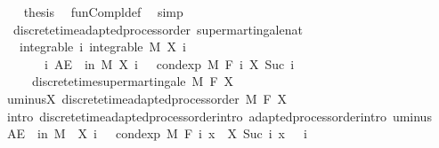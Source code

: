 \begin{isabellebody}
\ \ \isamarkupfalse%
\ {\isacharquery}{\kern0pt}thesis\ \isamarkupfalse%
\ fun{\isacharunderscore}{\kern0pt}Compl{\isacharunderscore}{\kern0pt}def\ \isamarkupfalse%
\ simp\isanewline
{}\isamarkupfalse%
%
\endisatagproof
{\isafoldproof}%
%
\isadelimproof
\isanewline
%
\endisadelimproof
\isanewline
{}\isamarkupfalse%
\ {\isacharparenleft}{\kern0pt}\ discrete{\isacharunderscore}{\kern0pt}time{\isacharunderscore}{\kern0pt}adapted{\isacharunderscore}{\kern0pt}process{\isacharunderscore}{\kern0pt}order{\isacharparenright}{\kern0pt}\ supermartingale{\isacharunderscore}{\kern0pt}nat{\isacharcolon}{\kern0pt}\isanewline
\ \ \ integrable{\isacharcolon}{\kern0pt}\ {\isachardoublequoteopen}{\isasymAnd}i{\isachardot}{\kern0pt}\ integrable\ M\ {\isacharparenleft}{\kern0pt}X\ i{\isacharparenright}{\kern0pt}{\isachardoublequoteclose}\ \isanewline
\ \ \ \ \ \ \ {\isachardoublequoteopen}{\isasymAnd}i{\isachardot}{\kern0pt}\ AE\ {\isasymxi}\ in\ M{\isachardot}{\kern0pt}\ X\ i\ {\isasymxi}\ {\isasymge}\ cond{\isacharunderscore}{\kern0pt}exp\ M\ {\isacharparenleft}{\kern0pt}F\ i{\isacharparenright}{\kern0pt}\ {\isacharparenleft}{\kern0pt}X\ {\isacharparenleft}{\kern0pt}Suc\ i{\isacharparenright}{\kern0pt}{\isacharparenright}{\kern0pt}\ {\isasymxi}{\isachardoublequoteclose}\ \isanewline
\ \ \ \ \ {\isachardoublequoteopen}discrete{\isacharunderscore}{\kern0pt}time{\isacharunderscore}{\kern0pt}supermartingale\ M\ F\ X{\isachardoublequoteclose}\isanewline
%
\isadelimproof
%
\endisadelimproof
%
\isatagproof
{}\isamarkupfalse%
\ {\isacharminus}{\kern0pt}\isanewline
\ \ \isamarkupfalse%
\ uminus{\isacharunderscore}{\kern0pt}X{\isacharcolon}{\kern0pt}\ discrete{\isacharunderscore}{\kern0pt}time{\isacharunderscore}{\kern0pt}adapted{\isacharunderscore}{\kern0pt}process{\isacharunderscore}{\kern0pt}order\ M\ F\ {\isachardoublequoteopen}{\isacharminus}{\kern0pt}X{\isachardoublequoteclose}\ \isamarkupfalse%
\ {\isacharparenleft}{\kern0pt}intro\ discrete{\isacharunderscore}{\kern0pt}time{\isacharunderscore}{\kern0pt}adapted{\isacharunderscore}{\kern0pt}process{\isacharunderscore}{\kern0pt}order{\isachardot}{\kern0pt}intro\ adapted{\isacharunderscore}{\kern0pt}process{\isacharunderscore}{\kern0pt}order{\isachardot}{\kern0pt}intro\ uminus{\isacharparenright}{\kern0pt}\isanewline
\ \ \isamarkupfalse%
\ {\isachardoublequoteopen}AE\ {\isasymxi}\ in\ M{\isachardot}{\kern0pt}\ {\isacharminus}{\kern0pt}\ X\ i\ {\isasymxi}\ {\isasymle}\ cond{\isacharunderscore}{\kern0pt}exp\ M\ {\isacharparenleft}{\kern0pt}F\ i{\isacharparenright}{\kern0pt}\ {\isacharparenleft}{\kern0pt}{\isasymlambda}x{\isachardot}{\kern0pt}\ {\isacharminus}{\kern0pt}\ X\ {\isacharparenleft}{\kern0pt}Suc\ i{\isacharparenright}{\kern0pt}\ x{\isacharparenright}{\kern0pt}\ {\isasymxi}{\isachardoublequoteclose}\ \ i\ \isamarkupfalse%

\end{isabellebody}
